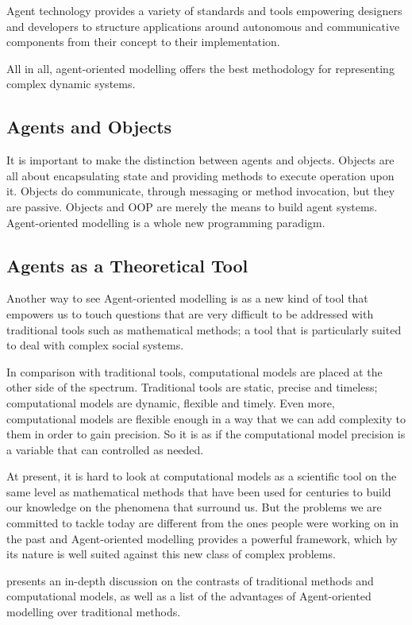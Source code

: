 Agent technology provides a variety of standards and tools empowering designers and developers to structure applications around autonomous and communicative components from their concept to their implementation. \cite{al3roadmap}

All in all, agent-oriented modelling offers the best methodology for representing complex dynamic systems.

\subsection{Agents and Objects}

It is important to make the distinction between agents and objects. Objects are all about encapsulating state and providing methods to execute operation upon it. Objects do communicate, through messaging or method invocation, but they are passive. Objects and \ac{OOP} are merely the means to build agent systems. Agent-oriented modelling is a whole new programming paradigm. 

\subsection{Agents as a Theoretical Tool}

Another way to see Agent-oriented modelling is as a new kind of tool that empowers us to touch questions that are very difficult to be addressed with traditional tools such as mathematical methods; a tool that is particularly suited to deal with complex social systems.

In comparison with traditional tools, computational models are placed at the other side of the spectrum. Traditional tools are static, precise and timeless; computational models are dynamic, flexible and timely. Even more, computational models are flexible enough in a way that we can add complexity to them in order to gain precision. So it is as if the computational model precision is a variable that can controlled as needed.

At present, it is hard to look at computational models as a scientific tool on the same level as  mathematical methods that have been used for centuries to build our knowledge on the phenomena that surround us. But the problems we are committed to tackle today are different from the ones people were working on in the past and Agent-oriented modelling provides a powerful framework, which by its nature is well suited against this new class of complex problems.

\citeauthor{miller2007complex} presents an in-depth discussion on the contrasts of traditional methods and computational models, as well as a list of the advantages of Agent-oriented modelling over traditional methods. 

